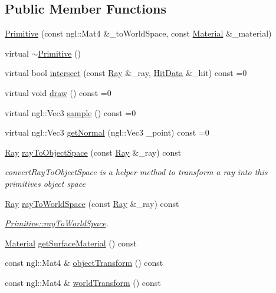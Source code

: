 \subsection*{Public Member Functions}
\begin{DoxyCompactItemize}
\item 
\hyperlink{classRenderer_1_1Primitive_aef85c08ccb6b189417433a81fa382513}{Primitive} (const ngl\+::\+Mat4 \&\+\_\+to\+World\+Space, const \hyperlink{structMaterial}{Material} \&\+\_\+material)
\item 
virtual \hyperlink{classRenderer_1_1Primitive_a72985fa9fd72f5229a9bfb638377f4c8}{$\sim$\+Primitive} ()
\item 
virtual bool \hyperlink{classRenderer_1_1Primitive_a22f0a7845bbec672a363f39fac4daf5e}{intersect} (const \hyperlink{structRenderer_1_1Ray}{Ray} \&\+\_\+ray, \hyperlink{structRenderer_1_1HitData}{Hit\+Data} \&\+\_\+hit) const =0
\item 
virtual void \hyperlink{classRenderer_1_1Primitive_a9ac7e1ff84d81f2a8f474cbaf36b41d0}{draw} () const =0
\item 
virtual ngl\+::\+Vec3 \hyperlink{classRenderer_1_1Primitive_a203efa6754633a8559c441a4de603b2d}{sample} () const =0
\item 
virtual ngl\+::\+Vec3 \hyperlink{classRenderer_1_1Primitive_ade88d0252e3c0bd1f1ee81df35afca0a}{get\+Normal} (ngl\+::\+Vec3 \+\_\+point) const =0
\item 
\hyperlink{structRenderer_1_1Ray}{Ray} \hyperlink{classRenderer_1_1Primitive_ab284806b9c1642ae80410607d606ae46}{ray\+To\+Object\+Space} (const \hyperlink{structRenderer_1_1Ray}{Ray} \&\+\_\+ray) const 
\begin{DoxyCompactList}\small\item\em convert\+Ray\+To\+Object\+Space is a helper method to transform a ray into this primitives object space \end{DoxyCompactList}\item 
\hyperlink{structRenderer_1_1Ray}{Ray} \hyperlink{classRenderer_1_1Primitive_aef8e1c3e54925ef164f094ef976ad78e}{ray\+To\+World\+Space} (const \hyperlink{structRenderer_1_1Ray}{Ray} \&\+\_\+ray) const 
\begin{DoxyCompactList}\small\item\em \hyperlink{classRenderer_1_1Primitive_aef8e1c3e54925ef164f094ef976ad78e}{Primitive\+::ray\+To\+World\+Space}. \end{DoxyCompactList}\item 
\hyperlink{structMaterial}{Material} \hyperlink{classRenderer_1_1Primitive_aa303dc1042f7305a3895049d5f1a51e2}{get\+Surface\+Material} () const 
\item 
const ngl\+::\+Mat4 \& \hyperlink{classRenderer_1_1Primitive_a935c1ff33ec49914cd4dfaafb92055f0}{object\+Transform} () const 
\item 
const ngl\+::\+Mat4 \& \hyperlink{classRenderer_1_1Primitive_a9a55765d6ba313e07482cd650700bd00}{world\+Transform} () const 
\end{DoxyCompactItemize}
